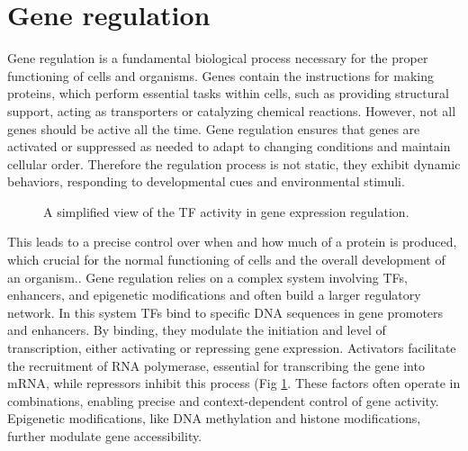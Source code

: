 \documentclass[pdftex,12pt,a4paper]{report}
\begin{document}
\section{Gene regulation}
Gene regulation is a fundamental biological process necessary for the proper functioning of cells and organisms. Genes contain the instructions for making proteins, which perform essential tasks within cells, such as providing structural support, acting as transporters or catalyzing chemical reactions. However, not all genes should be active all the time. Gene regulation ensures that genes are activated or suppressed as needed to adapt to changing conditions and maintain cellular order. Therefore the regulation process is not static, they exhibit dynamic behaviors, responding to developmental cues and environmental stimuli\cite{GRN2}. 
\begin{figure}
	\caption{A simplified view of the TF activity in gene expression regulation\cite{TF_fig}.}
	\label{TF_function}
\end{figure}
This leads to a precise control over when and how much of a protein is produced, which crucial for the normal functioning of cells and the overall development of an organism.\cite{proteinfunction}.
Gene regulation relies on a complex system involving TFs, enhancers, and epigenetic modifications and often build a larger regulatory network. In this system TFs bind to specific DNA sequences in gene promoters and enhancers. By binding, they modulate the initiation and level of transcription, either activating or repressing gene expression. Activators facilitate the recruitment of RNA polymerase, essential for transcribing the gene into mRNA, while repressors inhibit this process (Fig \ref{TF_function}. These factors often operate in combinations, enabling precise and context-dependent control of gene activity. Epigenetic modifications, like DNA methylation and histone modifications, further modulate gene accessibility\cite{TFs}.
\end{document}
